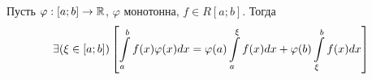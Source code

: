 \begin{teorema}
Пусть $\varphi:[a;b]\to\mathbb{R}$, $\varphi$ монотонна, $f\in R[a;b]$.
Тогда
$$
\exists(\xi\in[a;b])\left[\int\limits_a^b f(x)\varphi(x)dx=\varphi(a)\int\limits_a^\xi f(x) dx+\varphi(b)\int\limits_\xi^b f(x) dx\right]
$$
\end{teorema}
